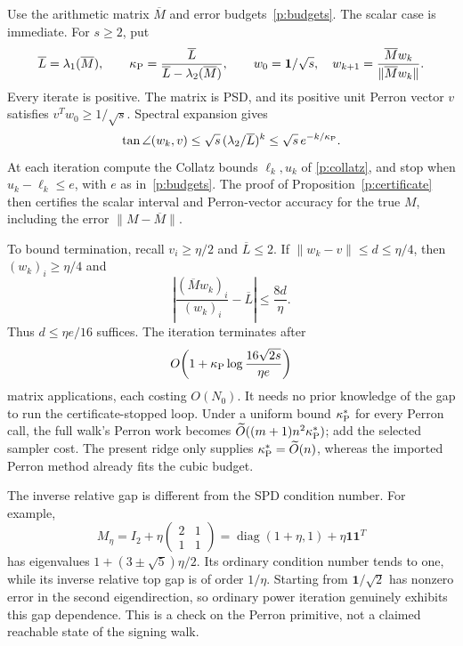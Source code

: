 \documentclass[11pt]{amsart}
\theoremstyle{definition}\newtheorem{definition}[theorem]{Definition}
\theoremstyle{remark}\newtheorem{remark}[theorem]{Remark}
\numberwithin{equation}{section}
\newcommand{\diag}{\operatorname{diag}}
\newcommand{\one}{\mathbf1}
\begin{document}
Use the arithmetic matrix $\overline M$ and error budgets~\eqref{p:budgets}.
The scalar case is immediate. For $s\ge2$, put
\[
 \overline L=\lambda_1(\overline M),\qquad
 \kappa_{\rm P}=\frac{\overline L}
     {\overline L-\lambda_2(\overline M)},\qquad
 w_0=\one/\sqrt s,
 \quad w_{k+1}=\frac{\overline M w_k}{\|\overline M w_k\|}.
\]
Every iterate is positive. The matrix is PSD, and its positive unit
Perron vector $v$ satisfies $v^Tw_0\ge1/\sqrt s$. Spectral expansion gives
\[
 \tan\angle(w_k,v)\le\sqrt s\,
       (\lambda_2/\overline L)^k
 \le\sqrt s\,e^{-k/\kappa_{\rm P}}.
\]
At each iteration compute the Collatz bounds $\ell_k,u_k$ of
\eqref{p:collatz}, and stop when $u_k-\ell_k\le e$, with $e$ as
in~\eqref{p:budgets}. The proof of Proposition~\ref{p:certificate}
then certifies the scalar interval and Perron-vector accuracy for the
true $M$, including the error $\|M-\overline M\|$.

To bound termination, recall $v_i\ge\eta/2$ and $\overline L\le2$.
If $\|w_k-v\|\le d\le\eta/4$, then $(w_k)_i\ge\eta/4$ and
\[
 \left|\frac{(\overline Mw_k)_i}{(w_k)_i}-\overline L\right|
 \le\frac{8d}{\eta}.
\]
Thus $d\le\eta e/16$ suffices. The iteration terminates after
\[
 O\!\left(1+\kappa_{\rm P}
       \log\frac{16\sqrt{2s}}{\eta e}\right)
\]
matrix applications, each costing $O(N_0)$. It needs no prior knowledge
of the gap to run the certificate-stopped loop. Under a uniform bound
$\kappa_{\rm P}^*$ for every Perron call, the full walk's Perron work
becomes $\widetilde O((m+1)n^2\kappa_{\rm P}^*)$; add the selected
sampler cost. The present ridge only supplies
$\kappa_{\rm P}^*=\widetilde O(n)$, whereas the imported Perron method
already fits the cubic budget.

The inverse relative gap is different from the SPD condition number.
For example,
\[
 M_\eta=I_2+\eta
 \begin{pmatrix}2&1\\1&1\end{pmatrix}
 =\diag(1+\eta,1)+\eta\one\one^T
\]
has eigenvalues $1+(3\pm\sqrt5)\eta/2$. Its ordinary condition number
tends to one, while its inverse relative top gap is of order $1/\eta$.
Starting from $\one/\sqrt2$ has nonzero error in the second eigendirection,
so ordinary power iteration genuinely exhibits this gap dependence.
This is a check on the Perron primitive, not a claimed reachable state
of the signing walk.
\end{document}
